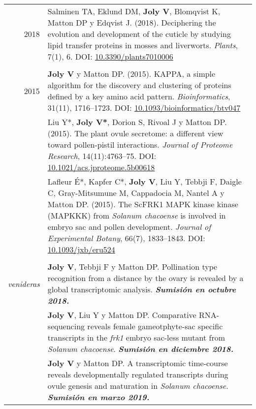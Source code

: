\documentclass[letterpaper,12pt]{article}
\begin{document}
\begin{tabularx}{\textwidth}{@{}r|X@{}}

2018
& Salminen TA, Eklund DM, \textbf{Joly V}, Blomqvist K, Matton DP
  y Edqvist J. (2018).
  Deciphering the evolution and development of the cuticle by studying lipid
  transfer proteins in mosses and liverworts.
  \emph{Plants}, 7(1), 6.
  DOI: \href{http://doi.org/10.3390/plants7010006}{10.3390/plants7010006}
  \\

\multicolumn{2}{c}{} \\

2015
& \textbf{Joly V} y Matton DP. (2015).
  KAPPA, a simple algorithm for the discovery and clustering of proteins defined
  by a key amino acid pattern.
  \emph{Bioinformatics}, 31(11), 1716--1723.
  DOI: \href{http://doi.org/10.1093/bioinformatics/btv047}
  {10.1093/bioinformatics/btv047}
  \vspace{3mm}
  \\

& Liu Y*, \textbf{Joly V*}, Dorion S, Rivoal J y Matton DP. (2015).
  The plant ovule secretome: a different view toward pollen-pistil interactions.
  \emph{Journal of Proteome Research}, 14(11):4763--75.
  DOI: \href{http://doi.org/10.1021/acs.jproteome.5b00618}
  {10.1021/acs.jproteome.5b00618}
  \vspace{3mm}
  \\

& Lafleur É*, Kapfer C*, \textbf{Joly V}, Liu Y, Tebbji F, Daigle C,
  Gray-Mitsumune M, Cappadocia M, Nantel A y Matton DP. (2015).
  The ScFRK1 MAPK kinase kinase (MAPKKK) from \emph{Solanum chacoense} is
  involved in embryo sac and pollen development.
  \emph{Journal of Experimental Botany}, 66(7), 1833--1843.
  DOI: \href{http://doi.org/10.1093/jxb/eru524}{10.1093/jxb/eru524}
  \\

\multicolumn{2}{c}{} \\

{\em venideras}
& \textbf{Joly V}, Tebbji F y Matton DP.
  Pollination type recognition from a distance by the ovary is revealed by a
  global transcriptomic analysis.
  {\bfseries\em Sumisión en octubre 2018.}
  \vspace{3mm}
  \\

& \textbf{Joly V}, Liu Y y Matton DP.
  Comparative RNA-sequencing reveals female gameotphyte-sac specific transcripts
  in the \emph{frk1} embryo sac-less mutant from \emph{Solanum chacoense}.
  {\bfseries\em Sumisión en diciembre 2018.}
  \vspace{3mm}
  \\

& \textbf{Joly V} y Matton DP.
  A transcriptomic time-course reveals developmentally regulated transcripts
  during ovule genesis and maturation in \emph{Solanum chacoense}.
  {\bfseries\em Sumisión en marzo 2019.} \\

\end{tabularx}
\end{document}
